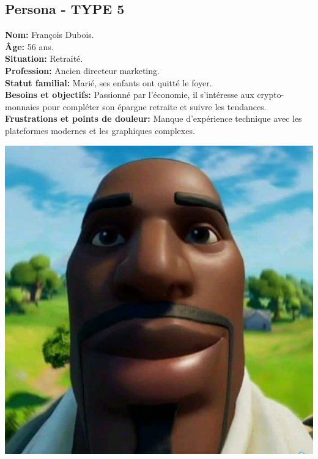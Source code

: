 \documentclass[a4paper,11pt]{article}
\begin{document}
\subsection{Persona - TYPE 5}
\begin{minipage}{0.6\textwidth} %
\textbf{Nom:} François Dubois.\\
\textbf{Âge:} 56 ans.\\
\textbf{Situation:} Retraité.\\
\textbf{Profession:} Ancien directeur marketing.\\
\textbf{Statut familial:} Marié, ses enfants ont quitté le foyer.\\
\textbf{Besoins et objectifs:} Passionné par l’économie, il s’intéresse aux crypto-monnaies pour compléter son épargne retraite et suivre les tendances.\\
\textbf{Frustrations et points de douleur:} Manque d’expérience technique avec les plateformes modernes et les graphiques complexes.\\
\end{minipage}%
\hspace{1cm}
\begin{minipage}{0.3\textwidth} %
    \begin{center}
        \includegraphics[width=\textwidth]{images/pnj.jpg} %
    \end{center}
\end{minipage}
\end{document}
